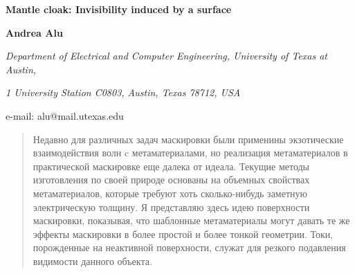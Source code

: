 \documentclass[12pt,a4paper]{article}
\newcommand{\tit}[1]{\begin{center}{\bf{\Large #1}}\end{center}}
\newcommand{\aut}[1]{\centerline{{\bf #1}}}
\newcommand{\cityorg}[1]{\centerline{\it #1}}
\newcommand{\email}[1]{\centerline{{\small e-mail: #1}}\vspace{\baselineskip}}
\begin{document}
\sloppy

 \tit{Mantle cloak: Invisibility induced by a surface}
 \aut{Andrea Alu}
 \cityorg{Department of Electrical and Computer Engineering, 
 University of Texas at Austin,}
 \cityorg{1 University Station C0803, Austin,  Texas 78712, USA}
 \email{alu@mail.utexas.edu}

\begin{abstract}
Недавно для различных задач маскировки были применины экзотические взаимодействия волн
c метаматериалами, но реализация метаматериалов в практической маскировке еще далека от
идеала. Текущие методы изготовления по своей природе основаны на объемных свойствах
метаматериалов, которые требуют хоть сколько-нибудь заметную электрическую толщину.
Я представляю здесь идею поверхности маскировки, показывая, что шаблонные
метаматериалы могут давать те же эффекты маскировки в более простой и более тонкой 
геометрии. Токи, порожденные на неактивной поверхности, служат для резкого подавления 
видимости данного объекта. 
\end{abstract}

\setcounter{secnumdepth}{5}
\end{document}
